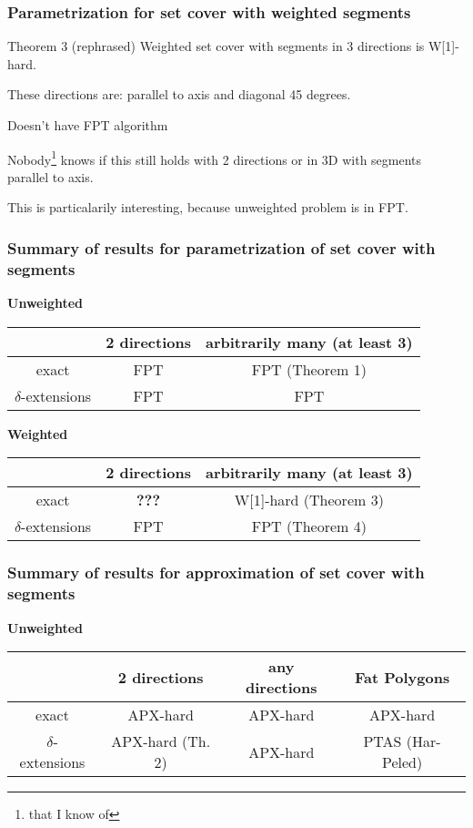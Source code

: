 \documentclass{beamer}
\begin{document}
\begin{frame}
\frametitle{Parametrization for set cover with weighted segments}
\begin{block}{Theorem 3 (rephrased)}
	Weighted set cover with segments in 3 directions is W[1]-hard.
	
	
These directions are: parallel to axis and diagonal 45 degrees.
	
	Doesn't have FPT algorithm
\end{block}

Nobody\footnote{that I know of} knows if this still holds with
2 directions or in 3D with segments parallel to axis.

This is particalarily interesting, because unweighted problem is in FPT.

\end{frame}

\begin{frame}

\frametitle{Summary of results for parametrization of set cover with segments}

\textbf{Unweighted}

\begin{tabular}{|c|c|c|}
\hline
 &2 directions & arbitrarily many (at least 3)\\
 \hline
 exact& FPT & \textcolor{olivegreen}{FPT (Theorem 1)}\\
 
 \hline
 $\delta$-extensions & FPT & \textcolor{olivegreen}{FPT}\\
\hline
\end{tabular}
\bigskip

\textbf{Weighted}

\begin{tabular}{|c|c|c|}
\hline
 &2 directions & arbitrarily many (at least 3)\\
 \hline
 exact& \textbf{???} & \textcolor{olivegreen}{W[1]-hard (Theorem 3)}\\
 
 \hline
 $\delta$-extensions & \textcolor{olivegreen}{FPT} & \textcolor{olivegreen}{FPT (Theorem 4)}\\
\hline
\end{tabular}

\end{frame}

\begin{frame}
\frametitle{Summary of results for approximation of set cover with segments}

\textbf{Unweighted}

\begin{tabular}{|c|c|c|c|}
\hline
 &2 directions & any directions & Fat Polygons\\
 \hline
 exact& APX-hard & \textcolor{olivegreen}{APX-hard} & APX-hard \\
 
 \hline
 $\delta$-extensions & \textcolor{olivegreen}{APX-hard (Th. 2)} & \textcolor{olivegreen}{APX-hard} & PTAS (Har-Peled)\\
\hline
\end{tabular}


\end{frame}
\end{document}
